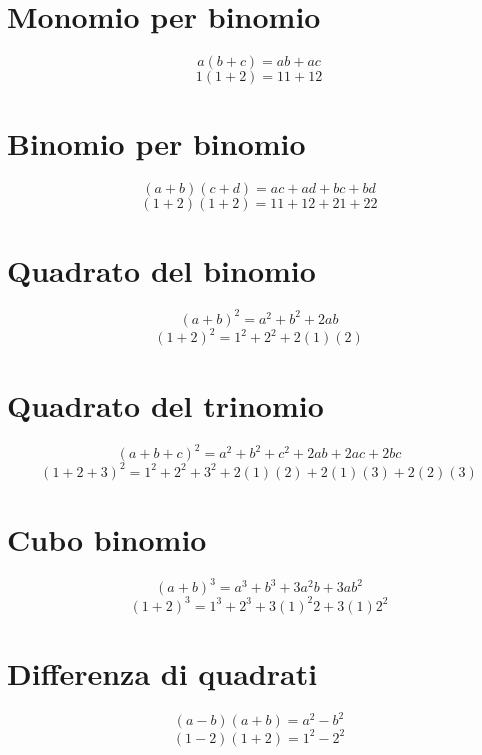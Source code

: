 \section{Monomio per binomio}
\begin{equation}
a(b+c)=ab+ac
\end{equation}
\begin{equation}
1(1+2)=11+12
\end{equation}
\section{Binomio per binomio}
\begin{equation}
(a+b)(c+d)=ac+ad+bc+bd
\end{equation}
\begin{equation}
(1+2)(1+2)=11+12+21+22
\end{equation}
\section{Quadrato del binomio}
\begin{equation}
	(a+b)^2=a^2+b^2+2ab
\end{equation}
\begin{equation}
(1+2)^2=1^2+2^2+2(1)(2)
\end{equation}
\section{Quadrato del trinomio}
\begin{equation}
(a+b+c)^2=a^2+b^2+c^2+2ab+2ac+2bc
\end{equation}
\begin{equation}
(1+2+3)^2=1^2+2^2+3^2+2(1)(2)+2(1)(3)+2(2)(3)
\end{equation}
\section{Cubo binomio}
\begin{equation}
(a+b)^3=a^3+b^3+3a^2b+3ab^2
\end{equation}
\begin{equation}
(1+2)^3=1^3+2^3+3(1)^2 2+3(1)2^2
\end{equation}
\section{Differenza di quadrati}
\begin{equation}
(a-b)(a+b)=a^2-b^2
\end{equation}
\begin{equation}
(1-2)(1+2)=1^2-2^2
\end{equation}
